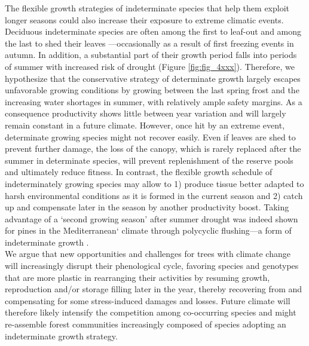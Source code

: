 \documentclass{article}
\begin{document}
The flexible growth strategies of indeterminate species that help them exploit longer seasons could also increase their exposure to extreme climatic events. Deciduous indeterminate species are often among the first to leaf-out and among the last to shed their leaves \citep{marksRelationExtensionGrowth1975, boojhGrowthStrategyTrees1982}---occasionally as a result of first freezing events in autumn. In addition, a substantial part of their growth period falls into periods of summer with increased risk of drought (Figure \ref{fig:fig_4xxx}). Therefore, we hypothesize that the conservative strategy of determinate growth largely escapes unfavorable growing conditions by growing between the last spring frost and the increasing water shortages in summer, with relatively ample safety margins. As a consequence productivity shows little between year variation and will largely remain constant in a future climate. However, once hit by an extreme event, determinate growing species might not recover easily. Even if leaves are shed to prevent further damage, the loss of the canopy, which is rarely replaced after the summer in determinate species, will prevent replenishment of the reserve pools and ultimately reduce fitness. In contrast, the flexible growth schedule of indeterminately growing species may allow to 1) produce tissue better adapted to harsh environmental conditions as it is formed in the current season and 2) catch up and compensate later in the season by another productivity boost. Taking advantage of a `second growing season' after summer drought was indeed shown for pines in the Mediterranean` climate through polycyclic flushing---a form of indeterminate growth \citep[Figure \ref{fig:fig_2xxx}]{girardPolycyclismFundamentalTree2011}. \\

We argue that new opportunities and challenges for trees with climate change will increasingly disrupt their phenological cycle, favoring species and genotypes that are more plastic in rearranging their activities by resuming growth, reproduction and/or storage filling later in the year, thereby recovering from and compensating for some stress-induced damages and losses. Future climate will therefore likely intensify the competition among co-occurring species and might re-assemble forest communities increasingly composed of species adopting an indeterminate growth strategy.
	
\end{document}
